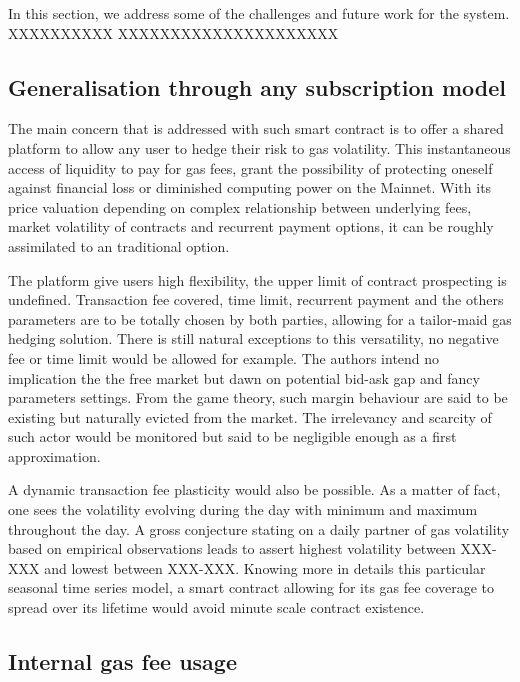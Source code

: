 In this section, we address some of the challenges and future work for the system. XXXXXXXXXX
XXXXXXXXXXXXXXXXXXXXX


 \subsection{Generalisation through any subscription model}
    
    The main concern that is addressed with such smart contract is to offer a shared platform to allow any user to hedge their risk to gas volatility. This instantaneous access of liquidity to pay for gas fees, grant the possibility of protecting oneself against financial loss or diminished computing power on the Mainnet. With its price valuation depending on complex relationship between underlying fees, market volatility of \textit{{\projectName}} contracts and recurrent payment options, it can be roughly assimilated to an traditional option.
    
    The platform give users high flexibility, the upper limit of contract prospecting is undefined. Transaction fee covered, time limit, recurrent payment and the others parameters are to be totally chosen by both parties, allowing for a tailor-maid gas hedging solution. There is still natural exceptions to this versatility, no negative fee or time limit would be allowed for example. The authors intend no implication the the free market but dawn on potential bid-ask gap and fancy parameters settings. From the game theory, such margin behaviour are said to be existing but naturally evicted from the market. The irrelevancy and scarcity of such actor would be monitored but said to be negligible enough as a first approximation.\cite{XXX}
    
    A dynamic transaction fee plasticity would also be possible. As a matter of fact, one sees the volatility evolving during the day with minimum and maximum throughout the day. A gross conjecture stating on a daily partner of gas volatility based on empirical observations leads to assert highest volatility between XXX-XXX and lowest between XXX-XXX. Knowing more in details this particular seasonal time series model, a smart contract allowing for its gas fee coverage to spread over its lifetime would avoid minute scale contract existence.
     
 \subsection{Internal gas fee usage}
    
